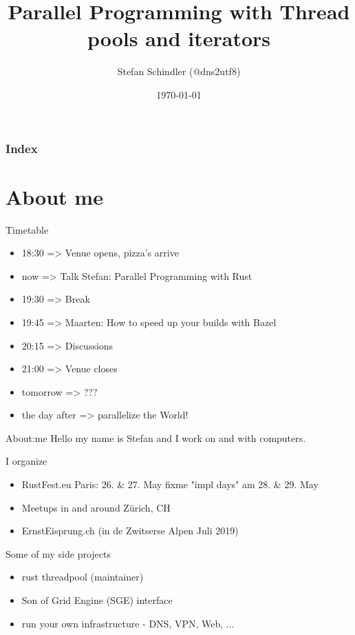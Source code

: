 \documentclass[aspectratio=1610,t]{beamer}
\title{Parallel Programming with Thread pools and iterators}
\date{\today}
\author{Stefan Schindler (@dns2utf8)}
\institute{Rust Zürichsee, Schweiz, CH - hosted by Cloud Solutions Amsterdam, NL}
\begin{document}

\maketitle


\begin{frame}
	\frametitle{Index}
	\setcounter{tocdepth}{1}
	\tableofcontents
\end{frame}



{
\section{About me}
}

\begin{frame}[fragile]{Timetable}
  \begin{itemize}
    \item 18:30 => Venue opens, pizza's arrive
    \item now => Talk Stefan: Parallel Programming with Rust
    \item 19:30 => Break
    \item 19:45 => Maarten: How to speed up your builds with Bazel
    \item 20:15 => Discussions
    \item 21:00 => Venue closes
    \item tomorrow => ???
    \item the day after => parallelize the World!
  \end{itemize}
\end{frame}


\begin{frame}[fragile]{About:me}
Hello my name is Stefan and I work on and with computers.

I organize
\begin{itemize}
  \item RustFest.eu Paris: 26. \& 27. May fixme "impl days" am 28. \& 29. May
  \item Meetups in and around Zürich, CH
  \item ErnstEisprung.ch (in de Zwitserse Alpen Juli 2019)
\end{itemize}

Some of my side projects
\begin{itemize}
  \item rust threadpool (maintainer)
  \item Son of Grid Engine (SGE) interface
  \item run your own infrastructure - DNS, VPN, Web, ...
\end{itemize}
\end{frame}
\end{document}
